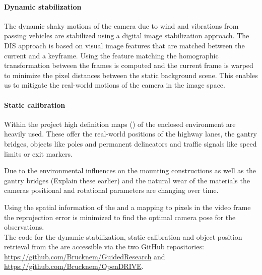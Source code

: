 \paragraph{Dynamic stabilization}
The dynamic shaky motions of the camera due to wind and vibrations from passing vehicles are stabilized using a digital image stabilization approach.
The DIS approach is based on visual image features that are matched between the current and a keyframe. 
Using the feature matching the homographic transformation between the frames is computed and the current frame is warped to minimize the pixel distances between the static background scene.
This enables us to mitigate the real-world motions of the camera in the image space.

\paragraph{Static calibration}
Within the project high definition maps (\HDmaps) of the enclosed environment are heavily used. 
These \HDmaps{} offer the real-world positions of the highway lanes, the gantry bridges, objects like poles and permanent delineators and traffic signals like speed limits or exit markers.

Due to the environmental influences on the mounting constructions as well as the gantry bridges (Explain these earlier) and the natural wear of the materials the cameras positional and rotational parameters are changing over time. 

Using the spatial information of the \HDmaps{} and a mapping to pixels in the video frame the reprojection error is minimized to find the optimal camera pose for the observations.\\

The code for the dynamic stabilization, static calibration and object position retrieval from the \HDmaps{} are accessible via the two GitHub repositories: \url{https://github.com/Brucknem/GuidedResearch} and \url{https://github.com/Brucknem/OpenDRIVE}.
